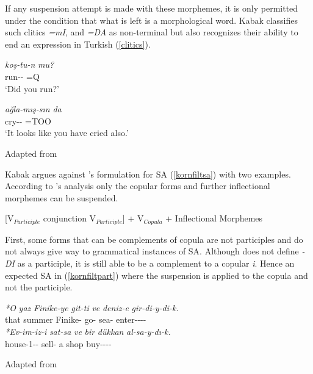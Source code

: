 If any suspension attempt is made with these morphemes, it is only permitted under the condition that what is left is a morphological word. Kabak classifies such clitics \textit{=mI}, and \textit{=DA} as non-terminal but also recognizes their ability to end an expression in Turkish (\ref{clitics}).

\begin{exe}
    \ex \label{clitics}
    \begin{xlist}
    \begin{multicols}{2}
        \ex
        \gll
        \textit{koş-tu-n} \textit{mu?} \\ run-{{\Pst}}-{\Second}{\Sg} =Q \\
        \glt `Did you run?'
        
        \ex 
        \gll
        \textit{ağla-mış-sın} \textit{da} \\ cry-{\Evi}-{\Second}{\Sg} =TOO \\ 
        \glt `It looks like you have cried also.'
    \end{multicols}
    \end{xlist}
    \hfill Adapted from \cite{kabak2007turkish}
\end{exe}
Kabak argues against \cite{kornfilt1996some}'s formulation for SA (\ref{kornfiltsa}) with two examples. According to \cite{kornfilt1996some}'s analysis only the copular forms and further inflectional morphemes can be suspended.
\begin{exe}
    \ex \label{kornfiltsa}
    [V$_{Participle}$ conjunction V$_{Participle}$] + V$_{Copula}$ + Inflectional Morphemes
\end{exe}

First, some forms that can be complements of copula are not participles and do not always give way to grammatical instances of SA. Although \cite{kornfilt1996some} does not define \textit{-DI} as a participle, it is still able to be a complement to a copular \textit{i}. Hence an expected SA in (\ref{kornfiltpart}) where the suspension is applied to the copula and not the participle.

\begin{exe}
    \ex \label{kornfiltpart}
    \begin{xlist}
        \ex
        \gll
        \textit{*O} \textit{yaz} \textit{Finike-ye} \textit{git-ti} \textit{ve} \textit{deniz-e} \textit{gir-di-y-di-k.} \\ that summer Finike-{\Dat} go-{{\Pst}} {\And} sea-{\Dat} enter-{{\Pst}}-{\Cop}-{{\Pst}}-{\First}{\Pl} \\
        
        \ex 
        \gll 
        \textit{*Ev-im-iz-i} \textit{sat-sa} \textit{ve} \textit{bir} \textit{dükkan} \textit{al-sa-y-dı-k.} \\ house-1-{\Pl}-{\Acc} sell-{\Cond} {\And} a shop buy-{\Cond}-{\Cop}-{{\Pst}}-{\First}{\Pl} \\
    \end{xlist}
\hfill Adapted from \cite{kabak2007turkish}
\end{exe}

